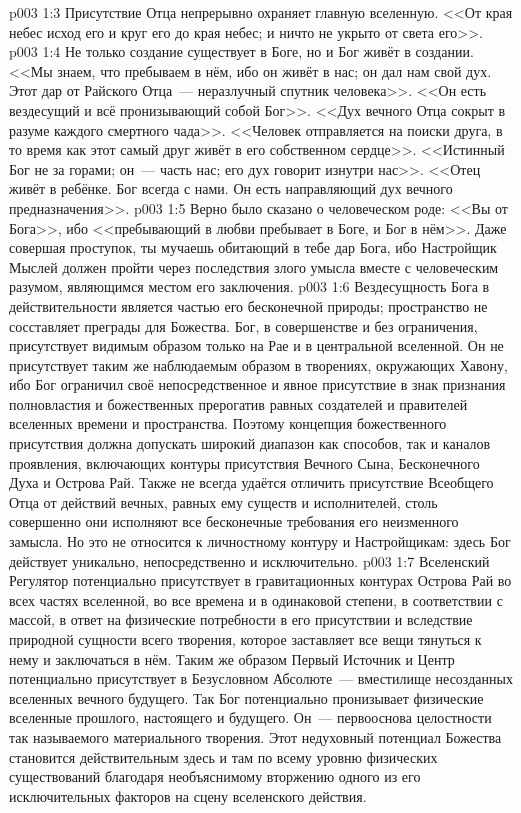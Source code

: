 \vs p003 1:3 Присутствие Отца непрерывно охраняет главную вселенную. <<От края небес исход его и круг его до края небес; и ничто не укрыто от света его>>.
\vs p003 1:4 \pc Не только создание существует в Боге, но и Бог живёт в создании. <<Мы знаем, что пребываем в нём, ибо он живёт в нас; он дал нам свой дух. Этот дар от Райского Отца~--- неразлучный спутник человека>>. <<Он есть вездесущий и всё пронизывающий собой Бог>>. <<Дух вечного Отца сокрыт в разуме каждого смертного чада>>. <<Человек отправляется на поиски друга, в то время как этот самый друг живёт в его собственном сердце>>. <<Истинный Бог не за горами; он~--- часть нас; его дух говорит изнутри нас>>. <<Отец живёт в ребёнке. Бог всегда с нами. Он есть направляющий дух вечного предназначения>>.
\vs p003 1:5 Верно было сказано о человеческом роде: <<Вы от Бога>>, ибо <<пребывающий в любви пребывает в Боге, и Бог в нём>>. Даже совершая проступок, ты мучаешь обитающий в тебе дар Бога, ибо Настройщик Мыслей должен пройти через последствия злого умысла вместе с человеческим разумом, являющимся местом его заключения.
\vs p003 1:6 \pc Вездесущность Бога в действительности является частью его бесконечной природы; пространство не сосставляет преграды для Божества. Бог, в совершенстве и без ограничения, присутствует видимым образом только на Рае и в центральной вселенной. Он не присутствует таким же наблюдаемым образом в творениях, окружающих Хавону, ибо Бог ограничил своё непосредственное и явное присутствие в знак признания полновластия и божественных прерогатив равных создателей и правителей вселенных времени и пространства. Поэтому концепция божественного присутствия должна допускать широкий диапазон как способов, так и каналов проявления, включающих контуры присутствия Вечного Сына, Бесконечного Духа и Острова Рай. Также не всегда удаётся отличить присутствие Всеобщего Отца от действий вечных, равных ему существ и исполнителей, столь совершенно они исполняют все бесконечные требования его неизменного замысла. Но это не относится к личностному контуру и Настройщикам: здесь Бог действует уникально, непосредственно и исключительно.
\vs p003 1:7 \pc Вселенский Регулятор потенциально присутствует в гравитационных контурах Острова Рай во всех частях вселенной, во все времена и в одинаковой степени, в соответствии с массой, в ответ на физические потребности в его присутствии и вследствие природной сущности всего творения, которое заставляет все вещи тянуться к нему и заключаться в нём. Таким же образом Первый Источник и Центр потенциально присутствует в Безусловном Абсолюте~--- вместилище несозданных вселенных вечного будущего. Так Бог потенциально пронизывает физические вселенные прошлого, настоящего и будущего. Он~--- первооснова целостности так называемого материального творения. Этот недуховный потенциал Божества становится действительным здесь и там по всему уровню физических существований благодаря необъяснимому вторжению одного из его исключительных факторов на сцену вселенского действия.
